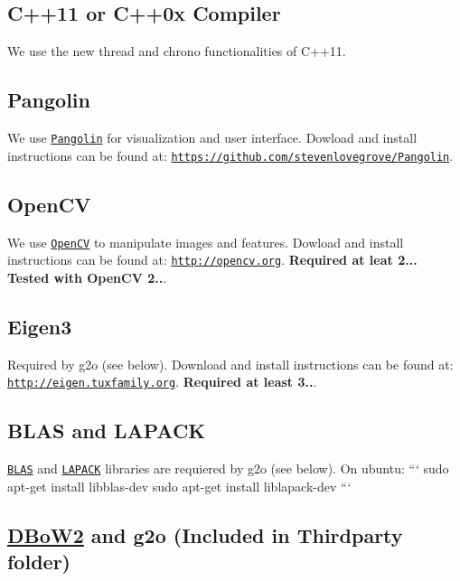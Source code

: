 \subsection*{C++11 or C++0x Compiler}

We use the new thread and chrono functionalities of C++11.

\subsection*{Pangolin}

We use \href{https://github.com/stevenlovegrove/Pangolin}{\tt Pangolin} for visualization and user interface. Dowload and install instructions can be found at\-: \href{https://github.com/stevenlovegrove/Pangolin}{\tt https\-://github.\-com/stevenlovegrove/\-Pangolin}.

\subsection*{Open\-C\-V}

We use \href{http://opencv.org}{\tt Open\-C\-V} to manipulate images and features. Dowload and install instructions can be found at\-: \href{http://opencv.org}{\tt http\-://opencv.\-org}. {\bfseries Required at leat 2... Tested with Open\-C\-V 2..}.

\subsection*{Eigen3}

Required by g2o (see below). Download and install instructions can be found at\-: \href{http://eigen.tuxfamily.org}{\tt http\-://eigen.\-tuxfamily.\-org}. {\bfseries Required at least 3..}.

\subsection*{B\-L\-A\-S and L\-A\-P\-A\-C\-K}

\href{http://www.netlib.org/blas}{\tt B\-L\-A\-S} and \href{http://www.netlib.org/lapack}{\tt L\-A\-P\-A\-C\-K} libraries are requiered by g2o (see below). On ubuntu\-: ``` sudo apt-\/get install libblas-\/dev sudo apt-\/get install liblapack-\/dev ```

\subsection*{\hyperlink{namespaceDBoW2}{D\-Bo\-W2} and g2o (Included in Thirdparty folder)}

